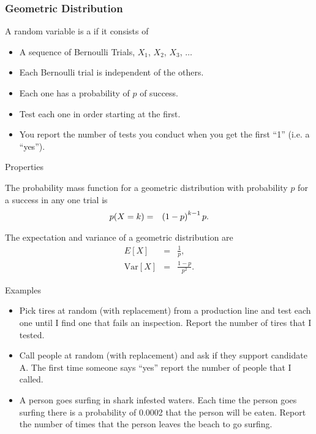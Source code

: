 \begin{frame}
  \frametitle{Geometric Distribution}

  \begin{definition}
    A random variable is a  if it
    consists of
    \begin{itemize}
    \item A sequence of Bernoulli Trials, $X_1$, $X_2$, $X_3$,
      $\ldots$
    \item Each Bernoulli trial is independent of the others.
    \item Each one has a probability of $p$ of success.
    \item Test each one in order starting at the first.
    \item You report the number of tests you conduct when you get the
      first ``1'' (i.e. a ``yes''). 
    \end{itemize}
  \end{definition}


\end{frame}

\begin{frame}{Properties}

  The probability mass function for a geometric distribution with
  probability $p$ for a success in any one trial is
  \begin{eqnarray*}
    p(X=k) & = & \left( 1-p\right)^{k-1} p.
  \end{eqnarray*}

  The expectation and variance of a geometric distribution are
  \begin{eqnarray*}
    E[X] & = & \frac{1}{p}, \\
    \mathrm{Var}[X] & = & \frac{1-p}{p^2}.
  \end{eqnarray*}

\end{frame}


\begin{frame}{Examples}

  \begin{itemize}
  \item Pick tires at random (with replacement) from a production line
    and test each one until I find one that fails an
    inspection. Report the number of
    tires that I tested.\\
  \item Call people at random (with replacement) and ask if they
    support candidate A. The first time someone says ``yes'' report
    the number of people that I called.
  \item A person goes surfing in shark infested waters. Each time the
    person goes surfing there is a probability of 0.0002 that the
    person will be eaten. Report the number of times that the person
    leaves the beach to go surfing.
  \end{itemize}
  
\end{frame}

